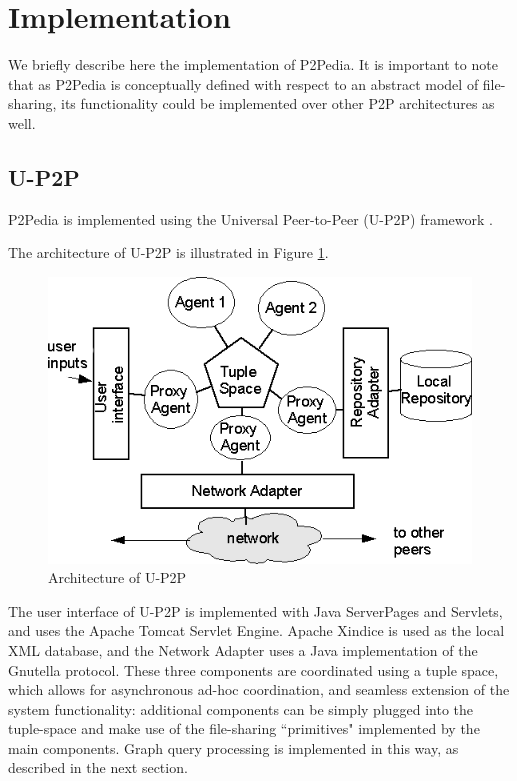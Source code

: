 \section{Implementation}
\label{sec:implementation}
We briefly describe here the implementation of P2Pedia. It is important to note that as P2Pedia is conceptually defined with respect to an abstract model of file-sharing, its functionality could be implemented over other P2P architectures as well.

\subsection{U-P2P}

P2Pedia is implemented using the Universal Peer-to-Peer (U-P2P) framework \cite{UP2P2002, UP2PSemelsJournal2009, UP2P:201101TechReport}. 

The architecture of U-P2P is illustrated in Figure \ref{fig:TSarchitecture}.
\begin{figure}[htb]
	\centering
		\includegraphics[scale=0.5]{U-P2Parchitecture.png}
	\caption{Architecture of U-P2P}
	\label{fig:TSarchitecture}
\end{figure}

The user interface of U-P2P is implemented with Java ServerPages and Servlets, and uses the Apache Tomcat Servlet Engine. Apache Xindice is used as the local XML database, and the Network Adapter uses a Java implementation of the Gnutella protocol. These three components are coordinated using a tuple space, which allows for asynchronous ad-hoc coordination, and seamless extension of the system functionality: additional components can be simply plugged into the tuple-space and make use of the file-sharing ``primitives" implemented by the main components. Graph query processing is implemented in this way, as described in the next section.

